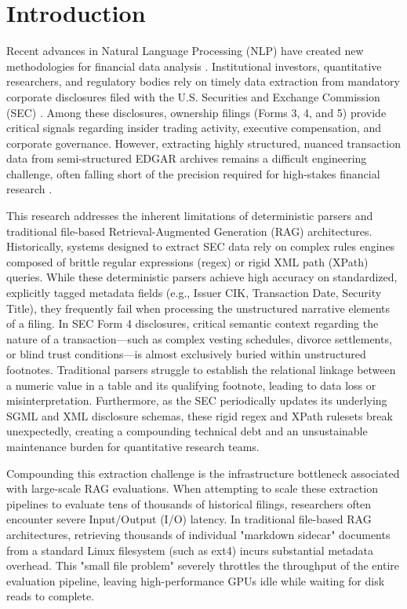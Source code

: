 \documentclass[journal, onecolumn]{IEEEtran}
\begin{document}
\section{Introduction}
Recent advances in Natural Language Processing (NLP) have created new methodologies for financial data analysis \cite{vaswani2017attention, radford2019language}. Institutional investors, quantitative researchers, and regulatory bodies rely on timely data extraction from mandatory corporate disclosures filed with the U.S. Securities and Exchange Commission (SEC) \cite{sec_edgar_docs}. Among these disclosures, ownership filings (Forms 3, 4, and 5) provide critical signals regarding insider trading activity, executive compensation, and corporate governance. However, extracting highly structured, nuanced transaction data from semi-structured EDGAR archives remains a difficult engineering challenge, often falling short of the precision required for high-stakes financial research \cite{bigeard2025financeagentbenchmarkbenchmarking}.

This research addresses the inherent limitations of deterministic parsers and traditional file-based Retrieval-Augmented Generation (RAG) architectures. Historically, systems designed to extract SEC data rely on complex rules engines composed of brittle regular expressions (regex) or rigid XML path (XPath) queries. While these deterministic parsers achieve high accuracy on standardized, explicitly tagged metadata fields (e.g., Issuer CIK, Transaction Date, Security Title), they frequently fail when processing the unstructured narrative elements of a filing. In SEC Form 4 disclosures, critical semantic context regarding the nature of a transaction---such as complex vesting schedules, divorce settlements, or blind trust conditions---is almost exclusively buried within unstructured footnotes. Traditional parsers struggle to establish the relational linkage between a numeric value in a table and its qualifying footnote, leading to data loss or misinterpretation. Furthermore, as the SEC periodically updates its underlying SGML and XML disclosure schemas, these rigid regex and XPath rulesets break unexpectedly, creating a compounding technical debt and an unsustainable maintenance burden for quantitative research teams.

Compounding this extraction challenge is the infrastructure bottleneck associated with large-scale RAG evaluations. When attempting to scale these extraction pipelines to evaluate tens of thousands of historical filings, researchers often encounter severe Input/Output (I/O) latency. In traditional file-based RAG architectures, retrieving thousands of individual "markdown sidecar" documents from a standard Linux filesystem (such as ext4) incurs substantial metadata overhead. This "small file problem" severely throttles the throughput of the entire evaluation pipeline, leaving high-performance GPUs idle while waiting for disk reads to complete.
\end{document}
